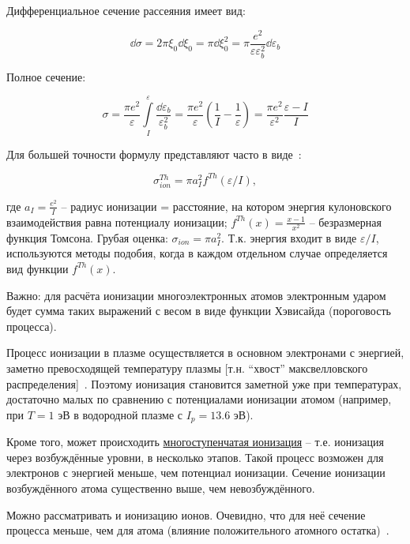 \documentclass[10pt, a4paper]{article}
\begin{document}
Дифференциальное сечение рассеяния имеет вид:

\begin{equation*}
	\dd\sigma = 2\pi\xi_0\dd\xi_0 = \pi \dd\xi_0^2 = \pi\frac{e^2}{\varepsilon\varepsilon_b^2}\dd\varepsilon_b
\end{equation*}

Полное сечение:

\begin{equation}
	\sigma = \frac{\pi e^2}{\varepsilon}\int\limits_{I}^\varepsilon\frac{\dd \varepsilon_b}{\varepsilon_b^2} = \frac{\pi e^2}{\varepsilon}\left( \frac{1}{I} - \frac{1}{\varepsilon} \right) = \frac{\pi e^2}{\varepsilon^2}\frac{\varepsilon - I}{I}
\end{equation}

Для большей точности формулу представляют часто в виде~\cite{astap}:

\begin{equation*}
	\sigma_{ion}^{Th} = \pi a_I^2 f^{Th}(\varepsilon/I),
\end{equation*}

где $a_I = \frac{e^2}{I}$ -- радиус ионизации = расстояние, на котором энергия кулоновского взаимодействия равна потенциалу ионизации; $f^{Th}(x) = \frac{x-1}{x^2}$ -- безразмерная функция Томсона. Грубая оценка: $\sigma_{ion} = \pi a_I^2$. Т.к. энергия входит в виде $\varepsilon/I$, используются методы подобия, когда в каждом отдельном случае определяется вид функции $f^{Th}(x)$. 

Важно: для расчёта ионизации многоэлектронных атомов электронным ударом будет сумма таких выражений с весом в виде функции Хэвисайда (пороговость процесса).

Процесс ионизации в плазме осуществляется в основном электронами с энергией, заметно превосходящей температуру плазмы [т.н. ``хвост'' максвелловского распределения]~\cite{astap}. Поэтому ионизация становится заметной уже при температурах, достаточно малых по сравнению с потенциалами ионизации атомом (например, при $T=1$ эВ в водородной плазме с $I_p=13.6$ эВ).

Кроме того, может происходить \uline{многоступенчатая ионизация} -- т.е. ионизация через возбуждённые уровни, в несколько этапов. Такой процесс возможен для электронов с энергией меньше, чем потенциал ионизации. Сечение ионизации возбуждённого атома существенно выше, чем невозбуждённого. 

Можно рассматривать и ионизацию ионов. Очевидно, что для неё сечение процесса меньше, чем для атома (влияние положительного атомного остатка)~\cite{raizer}.
\end{document}
